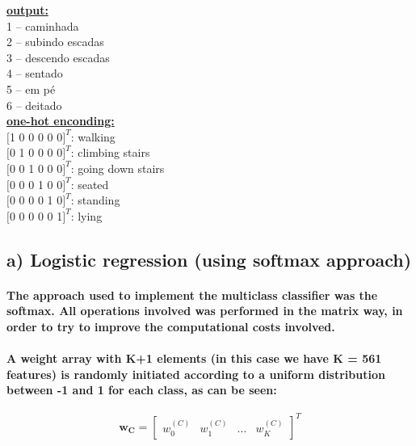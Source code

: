 \documentclass[a4paper]{article}    %
\begin{document}
\medskip
\begin{center}
    \begin{minipage}{.4\textwidth}
        \underline{\textbf{output:}}\medskip\\
        1 – caminhada\\
        2 – subindo escadas\\
        3 – descendo escadas\\
        4 – sentado\\
        5 – em pé\\
        6 – deitado\\[3mm]
        \underline{\textbf{one-hot enconding:}}\medskip\\
        $[$1 0 0 0 0 0$]^T$: walking\\
        $[$0 1 0 0 0 0$]^T$: climbing stairs\\
        $[$0 0 1 0 0 0$]^T$: going down stairs\\
        $[$0 0 0 1 0 0$]^T$: seated\\
        $[$0 0 0 0 1 0$]^T$: standing\\
        $[$0 0 0 0 0 1$]^T$: lying
    \end{minipage}
\end{center}

\subsection{a) Logistic regression (using softmax approach)}

\paragraph{The approach used to implement the multiclass classifier was the softmax. All operations involved was performed in the matrix way, in order to try to improve the computational costs involved.}

\paragraph{A weight array with K+1 elements (in this case we have K = 561 features) is randomly initiated according to a uniform distribution between -1 and 1 for each class, as can be seen:}


\[ \boldsymbol{w_C} = \begin{bmatrix} w_0^{(C)} & w_1^{(C)} & ... & w_K^{(C)} \end{bmatrix}^T \]
\end{document}
